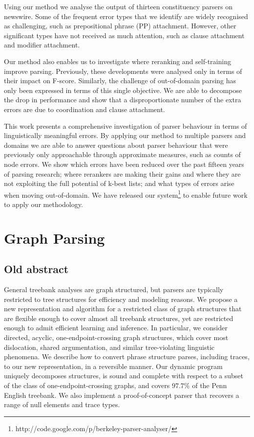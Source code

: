 Using our method we analyse the output of thirteen constituency parsers on
newswire.  Some of the frequent error types that we identify are widely recognised
as challenging, such as prepositional phrase (PP) attachment.  However, other
significant types have not received as much attention, such as clause
attachment and modifier attachment.

Our method also enables us to investigate where reranking and self-training
improve parsing.  Previously, these developments were analysed only in terms of
their impact on F-score.  Similarly, the challenge of out-of-domain parsing has
only been expressed in terms of this single objective.  We are able to
decompose the drop in performance and show that a disproportionate number of
the extra errors are due to coordination and clause attachment.

This work presents a comprehensive investigation of parser behaviour in terms
of linguistically meaningful errors.  By applying our method to multiple
parsers and domains we are able to answer questions about parser behaviour that
were previously only approachable through approximate measures, such as counts
of node errors.  We show which errors have been reduced over the past fifteen
years of parsing research; where rerankers are making their gains and where
they are not exploiting the full potential of k-best lists; and what types of
errors arise when moving out-of-domain.  We have released our
system\footnote{http://code.google.com/p/berkeley-parser-analyser/} to enable
future work to apply our methodology.

\section{Graph Parsing}

\subsection{Old abstract}
General treebank analyses are graph structured, but parsers are typically restricted to tree structures for efficiency and modeling reasons.
We propose a new representation and algorithm for a restricted class of graph structures that are flexible enough to cover almost all treebank structures, yet are restricted enough to admit efficient learning and inference.
In particular, we consider directed, acyclic, one-endpoint-crossing graph structures, which cover most dislocation, shared argumentation, and similar tree-violating linguistic phenomena.
We describe how to convert phrase structure parses, including traces, to our new representation, in a reversible manner.
Our dynamic program uniquely decomposes structures, is sound and complete with respect to a subset of the class of one-endpoint-crossing graphs, and covers $97.7\%$ of the Penn English treebank.
We also implement a proof-of-concept parser that recovers a range of null elements and trace types.


